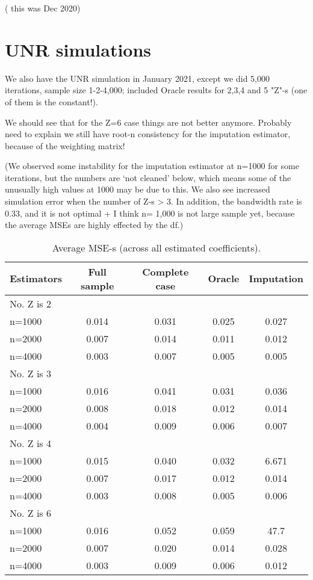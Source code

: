 \documentclass{article}
\theoremstyle{definition}
\theoremstyle{remark}
\begin{document}
( this was Dec 2020)

\section{UNR simulations}

We also have the UNR simulation in January 2021, except we did 5,000 iterations, sample size 1-2-4,000; included Oracle results for 2,3,4 and 5 "Z"-s (one of them is the constant!).

We should see that for the Z=6 case things are not better anymore. Probably need to explain we still have root-n consistency for the imputation estimator, because of the weighting matrix!

(We observed some instability for the imputation estimator at n=1000 for some iterations, but the numbers are `not cleaned' below, which means some of the unusually high values at 1000 may be due to this. We also see increased simulation error when the number of Z-s > 3. In addition, the bandwidth rate is 0.33, and it is not optimal + I think n= 1,000 is not large sample yet, because the average MSEs are highly effected by the df.)

\begin{table}
\begin{tabular}{l|c|c|c|c}
Estimators	& Full sample & Complete case & Oracle & Imputation \\
\hline
No. Z is 2 &&&& \\
\hline
n=1000 & 0.014 & 0.031 & 0.025 & 0.027 \\
n=2000 & 0.007 & 0.014 & 0.011 & 0.012 \\
n=4000 & 0.003 & 0.007 & 0.005 & 0.005 \\ 
\hline
No. Z is 3 &&&& \\
\hline
n=1000 & 0.016 & 0.041 & 0.031 & 0.036 \\
n=2000 & 0.008 & 0.018 & 0.012 & 0.014 \\
n=4000 & 0.004 & 0.009 & 0.006 & 0.007 \\ 
\hline
No. Z is 4 &&&& \\
\hline
n=1000 &0.015 & 0.040& 0.032 & 6.671 \\
n=2000 & 0.007 & 0.017 & 0.012 & 0.014 \\
n=4000 & 0.003 & 0.008 & 0.005 & 0.006 \\ 
\hline
No. Z is 6 &&&& \\
\hline
	n=1000 & 0.016 & 0.052 & 0.059 & 47.7 \\
	n=2000 & 0.007 & 0.020 & 0.014 & 0.028 \\
	n=4000 & 0.003 & 0.009 & 0.006 & 0.012 \\ 
\end{tabular}
\caption{Average MSE-s (across all estimated coefficients).}
\end{table}	
\end{document}
